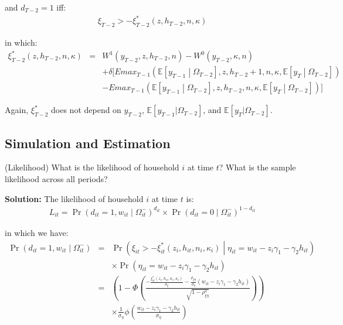\noindent and $d_{T-2} = 1$ iff:
\begin{eqnarray*}
\xi_{T-2} > -\xi^*_{T-2} \left(z, h_{T-2}, n, \kappa \right)
\end{eqnarray*}

\noindent in which:
\begin{eqnarray*}
\xi^*_{T-2} \left(z, h_{T-2}, n, \kappa \right) &=& W^1\left(y_{T-2}, z, h_{T-2}, n\right) - W^0\left(y_{T-2},\kappa, n \right)\\
& & + \delta [ Emax_{T-1} \left( \mathbb{E} [y_{T-1} \middle| \Omega_{T-2}], z, h_{T-2}+1, n, \kappa, \mathbb{E} [y_T \middle| \Omega_{T-2}] \right) \\
& & - Emax_{T-1} \left( \mathbb{E} [y_{T-1} \middle| \Omega_{T-2}], z, h_{T-2}, n, \kappa, \mathbb{E} [y_T \middle| \Omega_{T-2}] \right)]
\end{eqnarray*}

\noindent Again, $\xi_{T-2}^*$ does not depend on $y_{T-2}$, $\mathbb{E} [y_{T-1} | \Omega_{T-2}]$, and $\mathbb{E} [y_T | \Omega_{T-2}]$.

\subsection{Simulation and Estimation}

\begin{exercise} (Likelihood)
What is the likelihood of household $i$ at time $t$? What is the sample likelihood across all periods?
\end{exercise}

\noindent\textbf{Solution:} The likelihood of household $i$ at time $t$ is:
\begin{eqnarray*}
L_{it} = \Pr \left(d_{it} = 1, w_{it} \middle| \Omega_{it}^- \right)^{d_{it}} \times \Pr \left(d_{it} = 0 \middle| \Omega_{it}^- \right)^{1-d_{it}}
\end{eqnarray*}

\noindent in which we have:
\begin{eqnarray*}
\Pr\left(d_{it}=1, w_{it} \middle| \Omega_{it}^- \right) &=& \Pr \left( \xi_{it} > -\xi_{it}^* \left(z_i, h_{it}, n_i, \kappa_i \right) \middle| \eta_{it} = w_{it} -z_i \gamma_1 - \gamma_2 h_{it} \right)\\
& & \times \Pr \left( \eta_{it} = w_{it} -z_i \gamma_1 - \gamma_2 h_{it} \right)\\
&=& \left( 1 - \Phi \left(\frac{-\frac{\xi_{it}^* \left(z_i, h_{it}, n_i, \kappa_i \right)}{\sigma_\xi} - \frac{\rho_{\xi \eta}}{\sigma_\eta} \left(w_{it} - z_i \gamma_1 - \gamma_2 h_{it} \right)}{\sqrt{1-\rho_{\xi \eta}^2}} \right) \right) \\
& & \times \frac{1}{\sigma_\eta} \phi \left( \frac{w_{it} - z_i \gamma_1 - \gamma_2 h_{it}}{\sigma_\eta} \right) 
\end{eqnarray*}

